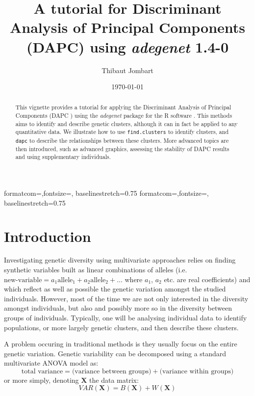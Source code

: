 \documentclass{article}
\title{A tutorial for Discriminant Analysis of Principal Components (DAPC) using \textit{adegenet} 1.4-0}
\author{Thibaut Jombart}
\date{\today}
\newcommand{\m}[1]{\mathbf{#1}}
\newcommand{\code}[1]{{{\tt #1}}}
\begin{document}
{formatcom={\color{Sinput}},fontsize=\footnotesize, baselinestretch=0.75}
{formatcom={\color{Soutput}},fontsize=\footnotesize, baselinestretch=0.75}

\color{black}

\maketitle

\begin{abstract}
  This vignette provides a tutorial for applying the Discriminant Analysis of Principal Components
  (DAPC \cite{tjart19}) using the \textit{adegenet} package \cite{tjart05} for the R software
  \cite{np145}. This methods aims to identify and describe genetic clusters, although it can in fact
  be applied to any quantitative data. We illustrate how to use \code{find.clusters} to identify
  clusters, and \code{dapc} to describe the relationships between these clusters. More advanced
  topics are then introduced, such as advanced graphics, assessing the stability of DAPC results and
  using supplementary individuals.
\end{abstract}


\newpage
\tableofcontents


\newpage
\section{Introduction}


Investigating genetic diversity using multivariate approaches relies on finding synthetic variables
built as linear combinations of alleles (i.e. $\mbox{new-variable} = a_1 \mbox{allele}_1 + a_2 \mbox{allele}_2 + ... $
where $a_1$, $a_2$ etc. are real coefficients)
and which reflect as well as possible the genetic variation amongst the studied individuals.
However, most of the time we are not only interested in the diversity amongst individuals, but
also and possibly more so in the diversity between groups of individuals.
Typically, one will be analysing individual data to identify populations, or more largely genetic
clusters, and then describe these clusters.

A problem occuring in traditional methods is they usually focus on the entire genetic variation.
Genetic variability can be decomposed using a standard multivariate ANOVA model as:
$$
\mbox{total variance} = \mbox{(variance between groups)} + \mbox{(variance within groups)}
$$
or more simply, denoting $\m{X}$ the data matrix:
$$
VAR(\m{X}) = B(\m{X}) + W(\m{X})
$$
\end{document}
